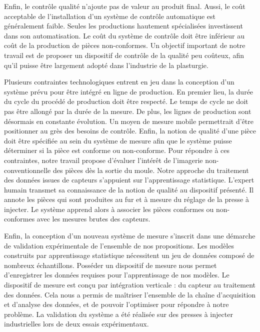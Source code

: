 Enfin, le contrôle qualité n'ajoute pas de valeur au produit final.
Aussi, le coût acceptable de l'installation d'un système de contrôle automatique est généralement faible.
Seules les productions hautement spécialisées investissent dans son automatisation.
Le coût du système de contrôle doit être inférieur au coût de la production de pièces non-conformes.
Un objectif important de notre travail est de proposer un dispositif de contrôle de la qualité peu coûteux, afin qu'il puisse être largement adopté dans l'industrie de la plasturgie.  %

Plusieurs contraintes technologiques entrent en jeu dans la conception d'un système prévu pour être intégré en ligne de production.
En premier lieu, la durée du cycle du procédé de production doit être respecté.
Le temps de cycle ne doit pas être allongé par la durée de la mesure.
De plus, les lignes de production sont désormais en constante évolution.
Un moyen de mesure mobile permettrait d'être positionner au grès des besoins de contrôle.
Enfin, la notion de qualité d'une pièce doit être spécifiée au sein du système de mesure afin que le système puisse déterminer si la pièce est conforme ou non-conforme.
Pour répondre à ces contraintes, notre travail propose d'évaluer l'intérêt de l'imagerie non-conventionnelle des pièces dès la sortie du moule.
Notre approche du traitement des données issues de capteurs s'appuient sur l'apprentissage statistique.
L'expert humain transmet sa connaissance de la notion de qualité au dispositif présenté. %
Il annote les pièces qui sont produites au fur et à mesure du réglage de la presse à injecter.
Le système apprend alors à associer les pièces conformes ou non-conformes avec les mesures brutes des capteurs.

Enfin, la conception d'un nouveau système de mesure s'inscrit dans une démarche de validation expérimentale de l'ensemble de nos propositions.
Les modèles construits par apprentissage statistique nécessitent un jeu de données composé de nombreux échantillons.
Posséder un dispositif de mesure nous permet d'enregistrer les données requises pour l'apprentissage de nos modèles.
Le dispositif de mesure est conçu par intégration verticale : du capteur au traitement des données.
Cela nous a permis de maîtriser l'ensemble de la chaîne d'acquisition et d'analyse des données, et de pouvoir l'optimiser pour répondre à notre problème.
La validation du système a été réalisée sur des presses à injecter industrielles lors de deux essais expérimentaux.

